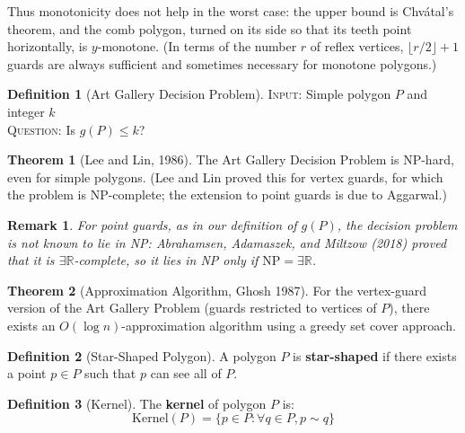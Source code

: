 \documentclass{article}
\newtheorem{remark}{Remark}
\theoremstyle{definition}
\newtheorem{theorem}{Theorem}
\newtheorem{definition}{Definition}
\begin{document}
Thus monotonicity does not help in the worst case: the upper bound is Chv\'{a}tal's theorem, and the comb polygon, turned on its side so that its teeth point horizontally, is $y$-monotone. (In terms of the number $r$ of reflex vertices, $\lfloor r/2 \rfloor + 1$ guards are always sufficient and sometimes necessary for monotone polygons.)


\begin{definition}[Art Gallery Decision Problem]
\textsc{Input:} Simple polygon $P$ and integer $k$\\
\textsc{Question:} Is $g(P) \leq k$?
\end{definition}

\begin{theorem}[Lee and Lin, 1986]
The Art Gallery Decision Problem is NP-hard, even for simple polygons. (Lee and Lin proved this for vertex guards, for which the problem is NP-complete; the extension to point guards is due to Aggarwal.)
\end{theorem}

\begin{remark}
For point guards, as in our definition of $g(P)$, the decision problem is not known to lie in NP: Abrahamsen, Adamaszek, and Miltzow (2018) proved that it is $\exists\mathbb{R}$-complete, so it lies in NP only if $\mathrm{NP} = \exists\mathbb{R}$.
\end{remark}

\begin{theorem}[Approximation Algorithm, Ghosh 1987]
For the vertex-guard version of the Art Gallery Problem (guards restricted to vertices of $P$), there exists an $O(\log n)$-approximation algorithm using a greedy set cover approach.
\end{theorem}


\begin{definition}[Star-Shaped Polygon]
A polygon $P$ is \textbf{star-shaped} if there exists a point $p \in P$ such that $p$ can see all of $P$.
\end{definition}

\begin{definition}[Kernel]
The \textbf{kernel} of polygon $P$ is:
$$\text{Kernel}(P) = \{p \in P : \forall q \in P, p \sim q\}$$
\end{definition}
\end{document}
